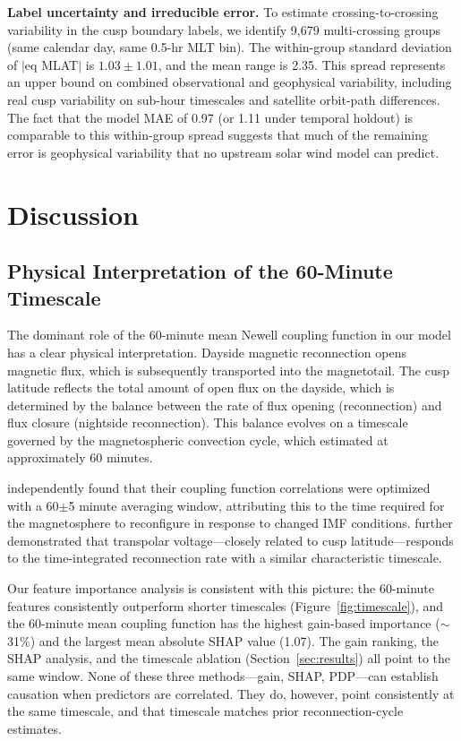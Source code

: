 \documentclass[draft]{agujournal2019}
\let\citet\citeA
\begin{document}
\textbf{Label uncertainty and irreducible error.} To estimate crossing-to-crossing variability in the cusp boundary labels, we identify 9{,}679 multi-crossing groups (same calendar day, same 0.5-hr MLT bin). The within-group standard deviation of $|$eq MLAT$|$ is $1.03 \pm 1.01$\textdegree, and the mean range is 2.35\textdegree. This spread represents an upper bound on combined observational and geophysical variability, including real cusp variability on sub-hour timescales and satellite orbit-path differences. The fact that the model MAE of 0.97\textdegree{} (or 1.11\textdegree{} under temporal holdout) is comparable to this within-group spread suggests that much of the remaining error is geophysical variability that no upstream solar wind model can predict.

\section{Discussion}
\label{sec:discussion}

\subsection{Physical Interpretation of the 60-Minute Timescale}

The dominant role of the 60-minute mean Newell coupling function in our model has a clear physical interpretation. Dayside magnetic reconnection opens magnetic flux, which is subsequently transported into the magnetotail. The cusp latitude reflects the total amount of open flux on the dayside, which is determined by the balance between the rate of flux opening (reconnection) and flux closure (nightside reconnection). This balance evolves on a timescale governed by the magnetospheric convection cycle, which \citet{burton1975dst} estimated at approximately 60 minutes.

\citet{newell2006cusp} independently found that their coupling function correlations were optimized with a 60$\pm$5 minute averaging window, attributing this to the time required for the magnetosphere to reconfigure in response to changed IMF conditions. \citet{lockwood2019coupling} further demonstrated that transpolar voltage---closely related to cusp latitude---responds to the time-integrated reconnection rate with a similar characteristic timescale.

Our feature importance analysis is consistent with this picture: the 60-minute features consistently outperform shorter timescales (Figure~\ref{fig:timescale}), and the 60-minute mean coupling function has the highest gain-based importance ($\sim$31\%) and the largest mean absolute SHAP value (1.07\textdegree). The gain ranking, the SHAP analysis, and the timescale ablation (Section~\ref{sec:results}) all point to the same window. None of these three methods---gain, SHAP, PDP---can establish causation when predictors are correlated. They do, however, point consistently at the same timescale, and that timescale matches prior reconnection-cycle estimates.
\end{document}
